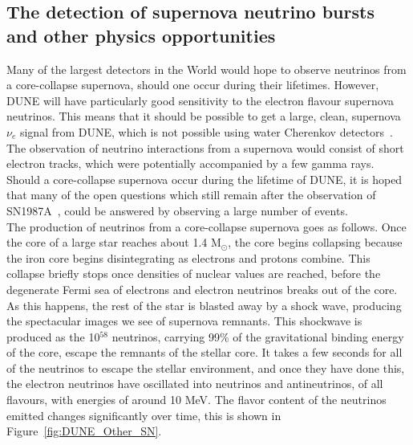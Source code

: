 \subsection{The detection of supernova neutrino bursts and other physics opportunities} \label{sec:DUNE_Other}%
Many of the largest detectors in the World would hope to observe neutrinos from a core-collapse supernova, should one occur during their lifetimes. However, DUNE will have particularly good sensitivity to the electron flavour supernova neutrinos. This means that it should be possible to get a large, clean, supernova $\nu_e$ signal from DUNE, which is not possible using water Cherenkov detectors~\citep{KScholSND, Laha:2013hva}. The observation of neutrino interactions from a supernova would consist of short electron tracks, which were potentially accompanied by a few gamma rays. Should a core-collapse supernova occur during the lifetime of DUNE, it is hoped that many of the open questions which still remain after the observation of SN1987A~\citep{PhysRevLett.58.1494, PhysRevLett.58.1490}, could be answered by observing a large number of events. \\

The production of neutrinos from a core-collapse supernova goes as follows. Once the core of a large star reaches about 1.4 M$_{\odot}$, the core begins collapsing because the iron core begins disintegrating as electrons and protons combine. This collapse briefly stops once densities of nuclear values are reached, before the degenerate Fermi sea of electrons and electron neutrinos breaks out of the core. As this happens, the rest of the star is blasted away by a shock wave, producing the spectacular images we see of supernova remnants. This shockwave is produced as the 10$^{58}$ neutrinos, carrying 99\% of the gravitational binding energy of the core, escape the remnants of the stellar core. It takes a few seconds for all of the neutrinos to escape the stellar environment, and once they have done this, the electron neutrinos have oscillated into neutrinos and antineutrinos, of all flavours, with energies of around 10 MeV. The flavor content of the neutrinos emitted changes significantly over time, this is shown in Figure~\ref{fig:DUNE_Other_SN}. \\


